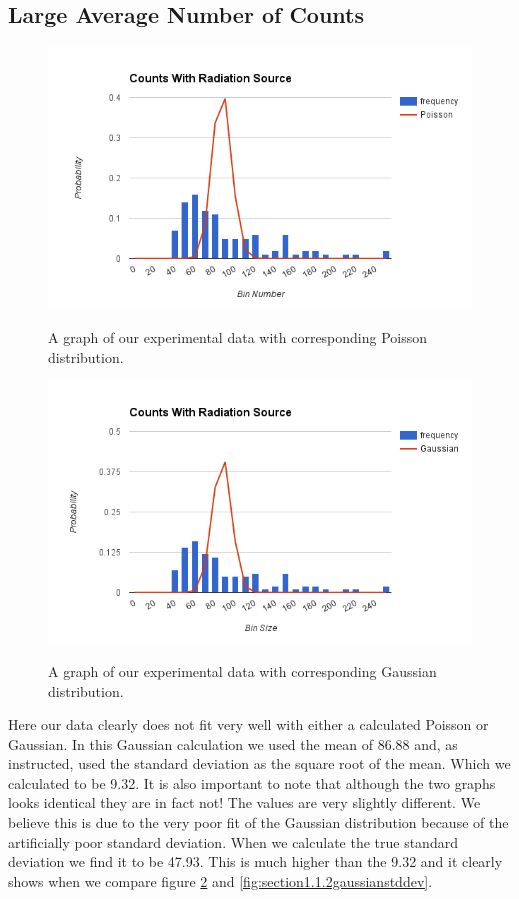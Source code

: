 \documentclass[12pt letterpaper]{article}
\begin{document}
\subsection*{Large Average Number of Counts}

\begin{figure}[H]
  \caption{A graph of our experimental data with corresponding Poisson distribution.}
  \centering
    \includegraphics[width=.75\textwidth]{section1_1_2_poisson.png}
    \label{fig:section1.1.2poisson}
\end{figure}

\begin{figure}[H]
  \caption{A graph of our experimental data with corresponding Gaussian distribution.}
  \centering
    \includegraphics[width=.75\textwidth]{section1_1_2_gaussian.png}
    \label{fig:section1.1.2gaussian}
\end{figure}

Here our data clearly does not fit very well with either a calculated Poisson or Gaussian. In this Gaussian calculation we used the mean of 86.88 and, as instructed, used the standard deviation as the square root of the mean. Which we calculated to be 9.32. It is also important to note that although the two graphs looks identical they are in fact not! The values are very slightly different. We believe this is due to the very poor fit of the Gaussian distribution because of the artificially poor standard deviation. When we calculate the true standard deviation we find it to be 47.93. This is much higher than the 9.32 and it clearly shows when we compare figure \ref{fig:section1.1.2gaussian} and \ref{fig:section1.1.2gaussianstddev}. 
\end{document}
